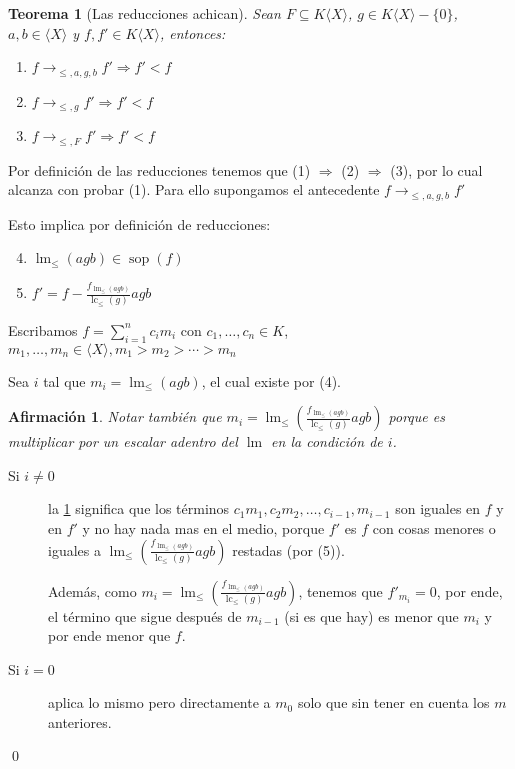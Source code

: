 \documentclass{report}
\theoremstyle{customstyle}
\newtheorem{theorem}{Teorema}[chapter]
\renewenvironment{proof}[1][\proofname]{{\bfseries #1: }}{\qed} %
\theoremstyle{factstyle}
\newtheorem{fact}{Afirmación}[theorem]
\DeclareMathOperator{\sop}{sop}
\DeclareMathOperator{\lm}{lm}
\DeclareMathOperator{\lc}{lc}
\begin{document}
\begin{theorem}[Las reducciones achican]\label{thm:→ achican}
  Sean $F ⊆ K⟨X⟩$, $g ∈ K⟨X⟩ - \{0\}$, $a, b ∈ ⟨X⟩$ y $f, f' ∈ K⟨X⟩$, entonces:
  \begin{enumerate}
    \item $f →_{≤, a, g, b} f' ⇒ f' < f$
    \item $f →_{≤, g} f' ⇒ f' < f$
    \item $f →_{≤, F} f' ⇒ f' < f$
  \end{enumerate}
\end{theorem}
  \begin{proof}
  Por definición de las reducciones tenemos que (1) $⇒$ (2) $⇒$ (3), por lo cual alcanza con probar (1). Para ello supongamos el antecedente $f →_{≤, a, g, b} f'$

  Esto implica por definición de reducciones:
  \begin{enumerate}
    \setcounter{enumi}{3}
    \item $\lm_≤(agb) ∈ \sop(f)$
    \item $f' = f - \frac{f_{\lm_≤(agb)}}{\lc_≤(g)}agb$
  \end{enumerate}

  Escribamos $f = ∑_{i = 1}^n c_i m_i$ con $c_1, …, c_n ∈ K$, $m_1, …, m_n ∈ ⟨X⟩, m_1 > m_2 > ⋯ > m_n$

  Sea $i$ tal que $m_i = \lm_≤(agb)$, el cual existe por (4).

  \begin{fact}\label{fact:→ achican:3}
    Notar también que $m_i = \lm_≤(\frac{f_{\lm_≤(agb)}}{\lc_≤(g)}agb)$ porque es multiplicar por un escalar adentro del $\lm$ en la condición de $i$.
  \end{fact}
  \begin{description}
    \item[Si $i ≠ 0$] la \cref{fact:→ achican:3} significa que los términos $c_1 m_1, c_2 m_2, …, c_{i-1}, m_{i-1}$ son iguales en $f$ y en $f'$ y no hay nada mas en el medio, porque $f'$ es $f$ con cosas menores o iguales a $\lm_≤(\frac{f_{\lm_≤(agb)}}{\lc_≤(g)}agb)$ restadas (por (5)).

    Además, como $m_i = \lm_≤(\frac{f_{\lm_≤(agb)}}{\lc_≤(g)}agb)$, tenemos que $f'_{m_i} = 0$, por ende, el término que sigue después de $m_{i-1}$ (si es que hay) es menor que $m_i$ y por ende menor que $f$.

    \item[Si $i = 0$] aplica lo mismo pero directamente a $m_0$ solo que sin tener en cuenta los $m$ anteriores.
  \end{description}

\end{proof}
\end{document}
